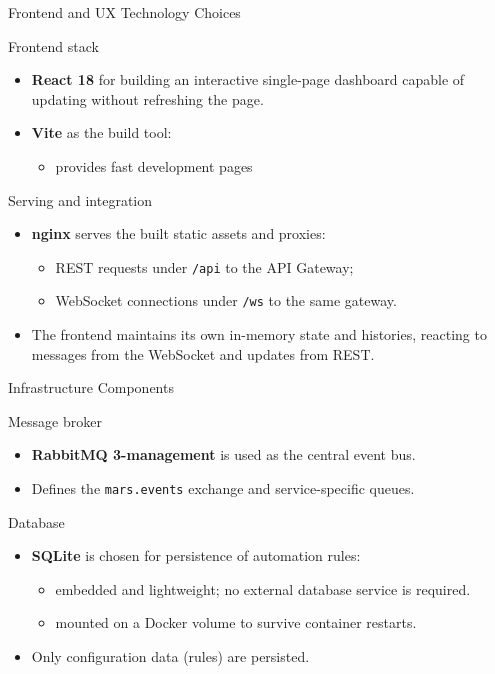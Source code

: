 \documentclass[aspectratio=169]{beamer}
\begin{document}
\begin{frame}{Frontend and UX Technology Choices}
  \begin{block}{Frontend stack}
    \begin{itemize}
      \item \textbf{React 18} for building an interactive single-page dashboard capable of updating without refreshing the page.
      \item \textbf{Vite} as the build tool:
        \begin{itemize}
          \item provides fast development pages
        \end{itemize}
    \end{itemize}
  \end{block}
  \vspace{0.2cm}
  \begin{block}{Serving and integration}
    \begin{itemize}
      \item \textbf{nginx} serves the built static assets and proxies:
        \begin{itemize}
          \item REST requests under \texttt{/api} to the API Gateway;
          \item WebSocket connections under \texttt{/ws} to the same gateway.
        \end{itemize}
      \item The frontend maintains its own in-memory state and histories, reacting to messages from the WebSocket and updates from REST.
    \end{itemize}
  \end{block}
\end{frame}

\begin{frame}{Infrastructure Components}
  \begin{block}{Message broker}
    \begin{itemize}
      \item \textbf{RabbitMQ 3-management} is used as the central event bus.
      \item Defines the \texttt{mars.events} exchange and service-specific queues.
    \end{itemize}
  \end{block}
  \vspace{0.2cm}
  \begin{block}{Database}
    \begin{itemize}
      \item \textbf{SQLite} is chosen for persistence of automation rules:
        \begin{itemize}
          \item embedded and lightweight; no external database service is required.
          \item mounted on a Docker volume to survive container restarts.
        \end{itemize}
      \item Only configuration data (rules) are persisted.
    \end{itemize}
  \end{block}
\end{frame}
\end{document}
